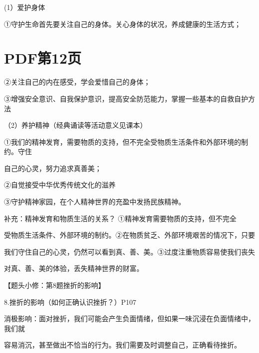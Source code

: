 \documentclass[lang=cn,11pt]{elegantbook}
\newcommand{\daofasym}[1]{{\daofasymbolfont #1}}
\newcommand{\daofasym}[1]{#1}
\begin{document}
(1）爱护身体\par

\daofasym{①}守护生命首先要关注自己的身体。关心身体的状况，养成健康的生活方式；\par


\section*{PDF第12页}

\daofasym{②}关注自己的内在感受，学会爱惜自己的身体；\par

\daofasym{③}增强安全意识、自我保护意识，提高安全防范能力，掌握一些基本的自救自护方法\par

（2）养护精神（经典诵读等活动意义见课本）\par

\daofasym{①}我们的精神发育，需要物质的支持，但不完全受物质生活条件和外部环境的制约。守住\par

自己的心灵，努力追求真善美；\par

\daofasym{②}自觉接受中华优秀传统文化的滋养\par

\daofasym{③}守护精神家园，在个人精神世界的充盈中发扬民族精神。\par

补充：精神发育和物质生活的关系？ \daofasym{①}精神发育需要物质的支持，但不完全\par

受物质生活条件、外部环境的制约。\daofasym{②}在物质贫乏、外部环境艰苦的情况下，只要\par

我们守住自己的心灵，仍然可以看到真、善、美。\daofasym{③}过度注重物质容易使我们丧失\par

对真、善、美的体验，丢失精神世界的财富。\par

【题头小修：第8题挫折的影响】\par

8.挫折的影响（如何正确认识挫折？）P107\par

消极影响：面对挫折，我们可能会产生负面情绪，但如果一味沉浸在负面情绪中，我们就\par

容易消沉，甚至做出不恰当的行为。我们需要及时调整自己，正确看待挫折。\par
\end{document}
